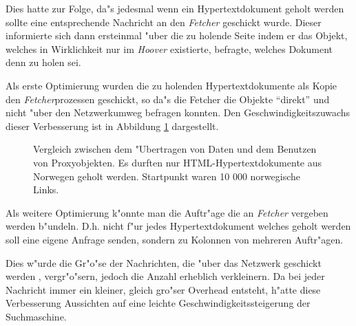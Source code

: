 Dies hatte zur Folge, da"s jedesmal wenn ein Hypertextdokument geholt werden sollte eine entsprechende Nachricht an den {\em Fetcher} geschickt wurde. Dieser informierte sich dann ersteinmal "uber die zu holende Seite indem er das Objekt, welches in Wirklichkeit nur im {\em Hoover} existierte, befragte, welches Dokument denn zu holen sei.

Als erste Optimierung wurden die zu holenden Hypertextdokumente als Kopie den {\em Fetcher}prozessen geschickt, so da"s die Fetcher die Objekte "`direkt"' und nicht "uber den Netzwerkumweg befragen konnten. Den Geschwindigkeitszuwachs dieser Verbesserung ist in Abbildung \ref{DatenVsObjekte} dargestellt.

\begin{figure}[t]
	\caption{Vergleich zwischen dem "Ubertragen von Daten und dem Benutzen von Proxyobjekten. Es durften nur HTML-Hypertextdokumente aus Norwegen geholt werden. Startpunkt waren 10 000 norwegische Links.}
	\label{DatenVsObjekte}
\end{figure}


Als weitere Optimierung k"onnte man die Auftr"age die an {\em Fetcher} vergeben werden b"undeln. D.h. nicht f"ur jedes Hypertextdokument welches geholt werden soll eine eigene Anfrage senden, sondern zu Kolonnen von mehreren Auftr"agen. 

Dies w"urde die Gr"o"se der Nachrichten, die "uber das Netzwerk geschickt werden , vergr"o"sern, jedoch die Anzahl erheblich verkleinern. Da bei jeder Nachricht immer ein kleiner, gleich gro"ser Overhead entsteht, h"atte diese Verbesserung Aussichten auf eine leichte Geschwindigkeitssteigerung der Suchmaschine.





